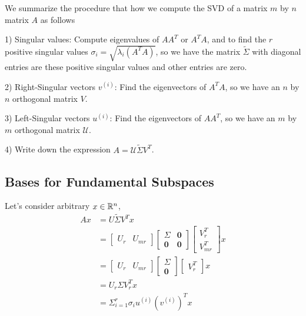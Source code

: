We summarize the procedure that how we compute the SVD of a matrix $m$ by $n$ matrix $A$ as follows

1) Singular values: Compute eigenvalues of $AA^T$ or $A^TA$, and to find the $r$ positive singular values $\sigma_i = \sqrt{\lambda_i(A^TA)}$, so we have the matrix $\tilde{\Sigma}$ with diagonal entries are these positive singular values and other entries are zero.


2) Right-Singular vectors $v^{(i)}$: Find the eigenvectors of $A^TA$, so we have an $n$ by $n$ orthogonal matrix $V$.

3) Left-Singular vectors $u^{(i)}$: Find the eigenvectors of $AA^T$, so we have an $m$ by $m$ orthogonal matrix $\mathcal{U}$.

4) Write down the expression $A = \mathcal{U} \tilde{\Sigma} V^T$.

\vspace{0.5cm}

\subsection{Bases for Fundamental Subspaces}
Let's consider arbitrary $x\in \mathbb{R}^n$, 
\begin{align*}
Ax 
&= U\tilde{\Sigma} V^Tx\\
&= 
\begin{bmatrix}%
U_r & U_{mr}
\end{bmatrix}
\begin{bmatrix}%
\Sigma & \textbf{0}\\
\textbf{0}& \textbf{0}
\end{bmatrix}
\begin{bmatrix}%
V_r^T\\
V_{mr}^T
\end{bmatrix}x\\
&= 
\begin{bmatrix}%
U_r & U_{mr}
\end{bmatrix}
\begin{bmatrix}%
\Sigma\\
\textbf{0}
\end{bmatrix}
\begin{bmatrix}%
V_r^T
\end{bmatrix}x\\
&=
U_r \Sigma V_r^T x\\
&= \Sigma^r_{i=1}\sigma_iu^{(i)}(v^{(i)})^Tx
\end{align*}
\\

